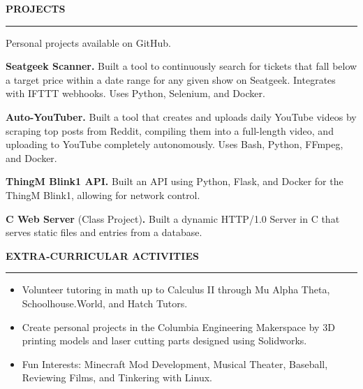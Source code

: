 \documentclass[10pt,letterpaper]{article}
\begin{document}
\medskip
\MakeUppercase{{\bf Projects}}
\medskip
\hrule
\begin{list}{}{\setlength{\leftmargin}{0em}}
    \item
          \vspace{-1.25em}
    \item {Personal projects available on GitHub. }
    \item \textbf{Seatgeek Scanner.} {Built a tool to continuously search for tickets that fall below a target price within a date range for any given show on Seatgeek. Integrates with IFTTT webhooks. Uses Python, Selenium, and Docker. }
    \item \textbf{Auto-YouTuber.} {Built a tool that creates and uploads daily YouTube videos by scraping top posts from Reddit, compiling them into a full-length video, and uploading to YouTube completely autonomously. Uses Bash, Python, FFmpeg, and Docker. }
    \item \textbf{ThingM Blink1 API.} {Built an API using Python, Flask, and Docker for the ThingM Blink1, allowing for network control.}
    \item \textbf{C Web Server} {(Class Project)\textbf{.} Built a dynamic HTTP/1.0 Server in C that serves static files and entries from a database.}
\end{list}


\medskip
\MakeUppercase{{\bf Extra-Curricular Activities}}
\medskip
\hrule
\begin{list}{}{\setlength{\leftmargin}{0em}}
    \item
          \begin{itemize}
              \item Volunteer tutoring in math up to Calculus II through Mu Alpha Theta, Schoolhouse.World, and Hatch Tutors.
              \item Create personal projects in the Columbia Engineering Makerspace by 3D printing models and laser cutting parts designed using Solidworks.
              \item Fun Interests: Minecraft Mod Development, Musical Theater, Baseball, Reviewing Films, and Tinkering with Linux.
          \end{itemize}
\end{list}


\end{document}
